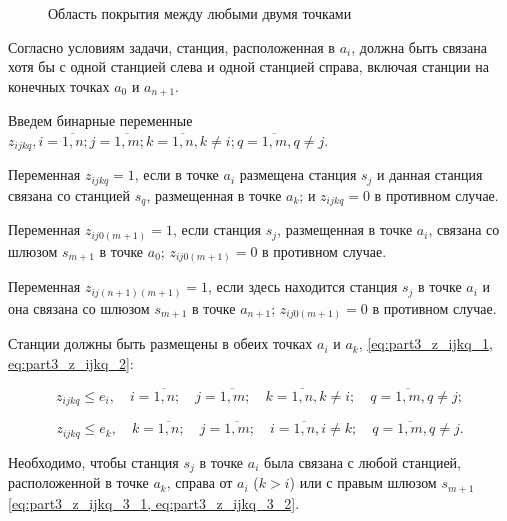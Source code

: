 \begin{figure}[ht]
  \caption{Область покрытия между любыми двумя точками}\label{fig:part3_total_coverage_between_points}
\end{figure}

Согласно условиям задачи, станция, расположенная в $ a_i $, должна быть связана хотя бы с одной станцией слева и одной станцией справа, включая станции на конечных точках $ a_0 $ и $a_{n + 1}$. 

Введем бинарные переменные $z_{ijkq}, i = \overline{1,n}; j= \overline{1,m}; k=\overline{1,n},  k \neq i; q= \overline{1,m}, q \neq j$.

Переменная $ z_ {ijkq} = 1$, если в точке $ a_i $ размещена станция $ s_j $ и данная станция связана со станцией $ s_q $, размещенная в точке $ a_k $; и $ z_ {ijkq} = 0 $ в противном случае.

Переменная $ z_{ij0(m + 1)} = 1$, если станция $ s_j $, размещенная в точке $ a_i $, связана со шлюзом $ s_{m + 1} $ в точке $ a_0 $; $ z_{ij0 (m + 1)} = 0 $ в противном случае.
 
Переменная $ z_{ij(n + 1)(m + 1)} = 1 $, если здесь находится станция $ s_j $ в точке $ a_i $ и она связана со шлюзом $ s_{m + 1} $ в точке $ a_{n + 1} $; $ z_{ij0(m + 1)} = 0 $  в противном случае.

Станции должны быть размещены в обеих точках $ a_i $ и $ a_k $, \cref{eq:part3_z_ijkq_1, eq:part3_z_ijkq_2}:

\begin{equation}
  \label{eq:part3_z_ijkq_1}
  z_{ijkq} \leq e_i , \quad i = \overline{1, n}; \quad j = \overline{1, m}; \quad k = \overline{1,n}, k \neq i; \quad q = \overline{1,m}, q \neq j;
\end{equation}


\begin{equation}
  \label{eq:part3_z_ijkq_2}
  z_{ijkq} \leq e_k , \quad k = \overline{1, n}; \quad j = \overline{1, m}; \quad i = \overline{1,n}, i \neq k; \quad q = \overline{1,m}, q \neq j.
\end{equation}


Необходимо, чтобы станция $ s_j $ в точке $ a_i $ была связана с  любой станцией, расположенной в точке $ a_k $, справа от $ a_i $ ($ k> i $) или с правым шлюзом $ s_{m + 1} $ \cref{eq:part3_z_ijkq_3_1, eq:part3_z_ijkq_3_2}. 

